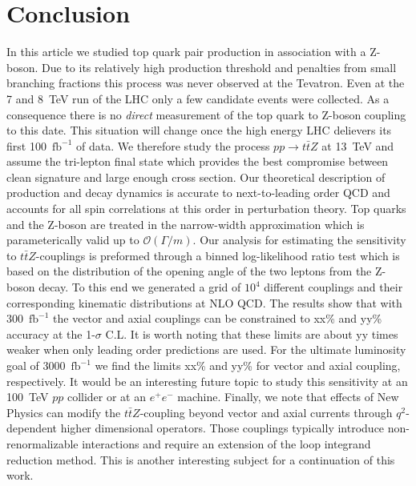 \documentclass[preprint]{JHEP3} %
\def\ttbZ{t\bar{t}Z}
\def\invfb {\mathrm{fb}^{-1}}
\begin{document}
\section{Conclusion}
In this article we studied top quark pair production in association with a Z-boson.
Due to its relatively high production threshold and 
penalties from small branching fractions 
this process was never observed at the Tevatron.
Even at the 7 and 8~TeV run of the LHC only a few candidate events were collected.
As a consequence there is no {\it direct} measurement of the top quark to Z-boson coupling to this date. 
This situation will change once the high energy LHC delievers its first 100~$\invfb$ of data.
We therefore study the process $pp\to\ttbZ$ at 13~TeV and assume the tri-lepton final state  
which provides the best compromise between clean signature and large enough cross section. 
Our theoretical description of production and decay dynamics is accurate to next-to-leading order QCD and
accounts for all spin correlations at this order in perturbation theory. 
Top quarks and the Z-boson are treated in the narrow-width approximation which is parameterically valid up to $\mathcal{O}(\Gamma \big/ m)$.
Our analysis for estimating the sensitivity to $\ttbZ$-couplings is preformed through a binned log-likelihood ratio test which is based on the 
distribution of the opening angle of the two leptons from the Z-boson decay.
To this end we generated a grid of $10^4$ different couplings and their corresponding kinematic distributions at NLO QCD. 
The results show that with 300~$\invfb$ the vector and axial couplings can be constrained to xx\% and yy\% accuracy at the 1-$\sigma$ C.L.
It is worth noting that these limits are about yy times weaker when only leading order predictions are used. 
For the ultimate luminosity goal of 3000~$\invfb$ we find the limits xx\% and yy\% for vector and axial coupling, respectively.
It would be an interesting future topic to study this sensitivity at an 100~TeV $pp$ collider or at an $e^+ e^-$ machine.
Finally, we note that effects of New Physics can modify the $\ttbZ$-coupling beyond vector and axial currents through $q^2$-dependent  higher dimensional operators. 
Those couplings typically introduce non-renormalizable interactions and require an extension of the loop integrand reduction method. 
This is another interesting subject for a continuation of this work.
\end{document}
